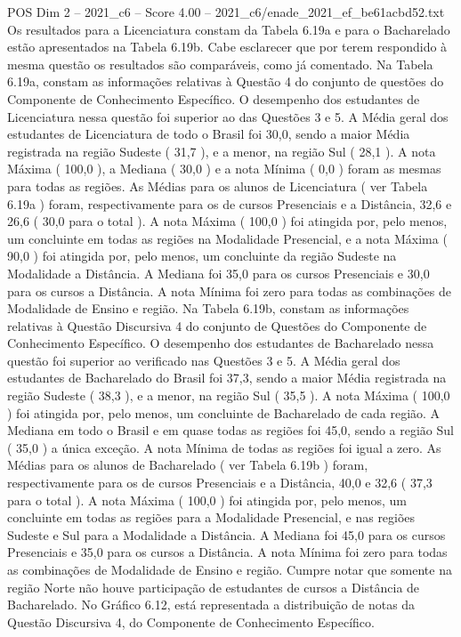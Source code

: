 \begin{textsample}{POS Dim 2 – 2021\_c6 – Score 4.00 – 2021\_c6/enade\_2021\_ef\_be61acbd52.txt}
Os resultados para a Licenciatura constam da Tabela 6.19a e para o Bacharelado estão apresentados na Tabela 6.19b.
Cabe esclarecer que por terem respondido à mesma questão os resultados são comparáveis, como já comentado.
Na Tabela 6.19a, constam as informações relativas à Questão 4 do conjunto de questões do Componente de Conhecimento Específico.
O desempenho dos estudantes de Licenciatura nessa questão foi superior ao das Questões 3 e 5.
A Média geral dos estudantes de Licenciatura de todo o Brasil foi 30,0, sendo a maior Média registrada na região Sudeste ( 31,7 ), e a menor, na região Sul ( 28,1 ).
A nota Máxima ( 100,0 ), a Mediana ( 30,0 ) e a nota Mínima ( 0,0 ) foram as mesmas para todas as regiões.
As Médias para os alunos de Licenciatura ( ver Tabela 6.19a ) foram, respectivamente para os de cursos Presenciais e a Distância, 32,6 e 26,6 ( 30,0 para o total ).
A nota Máxima ( 100,0 ) foi atingida por, pelo menos, um concluinte em todas as regiões na Modalidade Presencial, e a nota Máxima ( 90,0 ) foi atingida por, pelo menos, um concluinte da região Sudeste na Modalidade a Distância.
A Mediana foi 35,0 para os cursos Presenciais e 30,0 para os cursos a Distância.
A nota Mínima foi zero para todas as combinações de Modalidade de Ensino e região.
Na Tabela 6.19b, constam as informações relativas à Questão Discursiva 4 do conjunto de Questões do Componente de Conhecimento Específico.
O desempenho dos estudantes de Bacharelado nessa questão foi superior ao verificado nas Questões 3 e 5.
A Média geral dos estudantes de Bacharelado do Brasil foi 37,3, sendo a maior Média registrada na região Sudeste ( 38,3 ), e a menor, na região Sul ( 35,5 ).
A nota Máxima ( 100,0 ) foi atingida por, pelo menos, um concluinte de Bacharelado de cada região.
A Mediana em todo o Brasil e em quase todas as regiões foi 45,0, sendo a região Sul ( 35,0 ) a única exceção.
A nota Mínima de todas as regiões foi igual a zero.
As Médias para os alunos de Bacharelado ( ver Tabela 6.19b ) foram, respectivamente para os de cursos Presenciais e a Distância, 40,0 e 32,6 ( 37,3 para o total ).
A nota Máxima ( 100,0 ) foi atingida por, pelo menos, um concluinte em todas as regiões para a Modalidade Presencial, e nas regiões Sudeste e Sul para a Modalidade a Distância.
A Mediana foi 45,0 para os cursos Presenciais e 35,0 para os cursos a Distância.
A nota Mínima foi zero para todas as combinações de Modalidade de Ensino e região.
Cumpre notar que somente na região Norte não houve participação de estudantes de cursos a Distância de Bacharelado.
No Gráfico 6.12, está representada a distribuição de notas da Questão Discursiva 4, do Componente de Conhecimento Específico.

\end{textsample}
